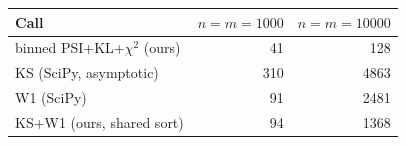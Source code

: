 \begin{tabular}{lrr}
\toprule
Call & $n=m=1000$ & $n=m=10000$ \\
\midrule
binned PSI+KL+$\chi^2$ (ours) & 41 & 128 \\
KS (SciPy, asymptotic) & 310 & 4863 \\
W1 (SciPy) & 91 & 2481 \\
KS+W1 (ours, shared sort) & 94 & 1368 \\
\bottomrule
\end{tabular}